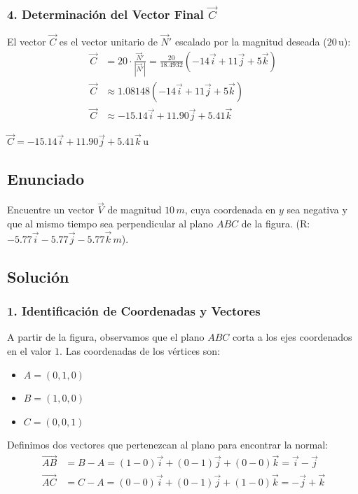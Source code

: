 \documentclass[12pt, a4paper]{article}
\begin{document}
\subsubsection*{4. Determinación del Vector Final $\vec{C}$}
El vector $\vec{C}$ es el vector unitario de $\vec{N}'$ escalado por la magnitud deseada ($20 \, \text{u}$):
\begin{align*}
    \vec{C} &= 20 \cdot \frac{\vec{N}'}{|\vec{N}'|} = \frac{20}{18.4932} (-14\vec{i} + 11\vec{j} + 5\vec{k}) \\
    \vec{C} &\approx 1.08148 (-14\vec{i} + 11\vec{j} + 5\vec{k}) \\
    \vec{C} &\approx -15.14\vec{i} + 11.90\vec{j} + 5.41\vec{k}
\end{align*}

\begin{tcolorbox}[colback=green!5!white, colframe=green!50!black, title=Respuesta Final]
\centering \Large $\vec{C} = -15.14\vec{i} + 11.90\vec{j} + 5.41\vec{k} \, \text{u}$
\end{tcolorbox}

\newpage

\subsection*{Enunciado}
Encuentre un vector $\vec{V}$ de magnitud $10 \, \si{m}$, cuya coordenada en $y$ sea negativa y que al mismo tiempo sea perpendicular al plano $ABC$ de la figura. (R: $-5.77\vec{i} - 5.77\vec{j} - 5.77\vec{k} \, \si{m}$).

\subsection*{Solución}

\subsubsection*{1. Identificación de Coordenadas y Vectores}
A partir de la figura, observamos que el plano $ABC$ corta a los ejes coordenados en el valor $1$. Las coordenadas de los vértices son:
\begin{itemize}
    \item $A = (0, 1, 0)$
    \item $B = (1, 0, 0)$
    \item $C = (0, 0, 1)$
\end{itemize}

Definimos dos vectores que pertenezcan al plano para encontrar la normal:
\begin{align*}
    \vec{AB} &= B - A = (1 - 0)\vec{i} + (0 - 1)\vec{j} + (0 - 0)\vec{k} = \vec{i} - \vec{j} \\
    \vec{AC} &= C - A = (0 - 0)\vec{i} + (0 - 1)\vec{j} + (1 - 0)\vec{k} = -\vec{j} + \vec{k}
\end{align*}
\end{document}
